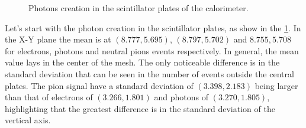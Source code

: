 \begin{figure}[htb!]
  \hspace{1em}

  \caption{Photons creation in the scintillator plates of the calorimeter.}\label{fig:photons-creation-scintillator}

\end{figure}

Let's start with the photon creation in the scintillator plates, as show in the
\cref{fig:photons-creation-scintillator}. In the X-Y plane the mean is at
\((8.777, 5.695)\), \((8.797, 5.702)\) and \(8.755, 5.708\) for electrons,
photons and neutral pions events respectively. In general, the mean value lays
in the center of the mesh. The only noticeable difference is in the standard
deviation that can be seen in the number of events outside the central plates.
The pion signal have a standard deviation of \((3.398, 2.183)\) being larger
than that of electrons of \((3.266, 1.801)\) and photons of \((3.270, 1.805)\),
highlighting that the greatest difference is in the standard deviation of the
vertical axis.

